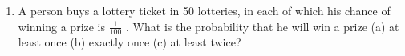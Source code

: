 \begin{enumerate}[label=\thechapter.\arabic*,ref=\thechapter.\theenumi]
\item A person buys a lottery ticket in 50 lotteries, in each of which his chance of winning a prize is $\frac{1}{100}$ . What is the probability that he will win a prize
(a) at least once (b) exactly once (c) at least twice?
\end{enumerate}

